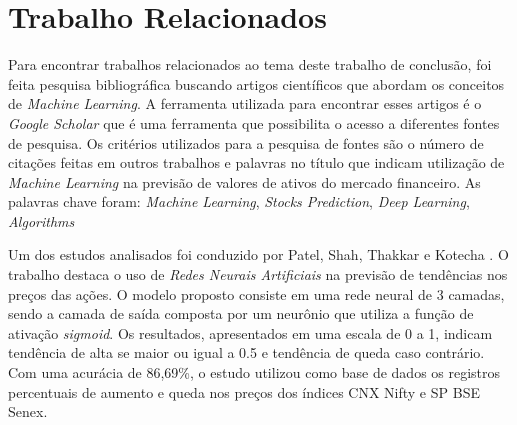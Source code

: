 \chapter{Trabalho Relacionados}
\label{ch:trabalhos_relacionados}


Para encontrar trabalhos relacionados ao tema deste trabalho de conclusão, foi feita pesquisa bibliográfica buscando artigos científicos que abordam os conceitos de \textit{Machine Learning}. A ferramenta utilizada para encontrar esses artigos é o \textit{Google Scholar} que é uma ferramenta que possibilita o acesso a diferentes fontes de pesquisa. Os critérios utilizados para a pesquisa de fontes são o número de citações feitas em outros trabalhos e palavras no título que indicam utilização de \textit{Machine Learning} na previsão de valores de ativos do mercado financeiro. As palavras chave foram: \textit{Machine Learning}, \textit{Stocks Prediction}, \textit{Deep Learning}, \textit{Algorithms}

Um dos estudos analisados foi conduzido por Patel, Shah, Thakkar e Kotecha \cite{Patel2015}. O trabalho destaca o uso de \textit{Redes Neurais Artificiais} na previsão de tendências nos preços das ações. O modelo proposto consiste em uma rede neural de 3 camadas, sendo a camada de saída composta por um neurônio que utiliza a função de ativação \textit{sigmoid}. Os resultados, apresentados em uma escala de 0 a 1, indicam tendência de alta se maior ou igual a 0.5 e tendência de queda caso contrário. Com uma acurácia de 86,69\%, o estudo utilizou como base de dados os registros percentuais de aumento e queda nos preços dos índices CNX Nifty e SP BSE Senex.

